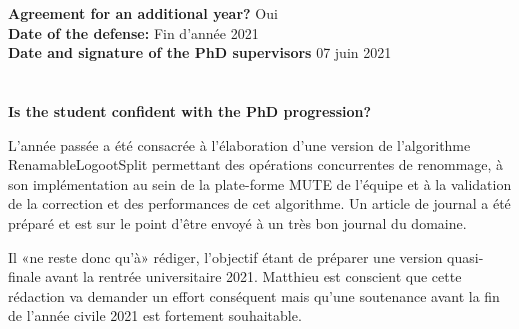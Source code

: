 \documentclass[12pt]{article}
\newcommand{\commentaire}[1]{\small\textit{#1}}
\begin{document}
\noindent\textbf{Agreement for an additional year?}
Oui
\\

\noindent\textbf{Date of the defense:}
Fin d'année 2021
\\


\noindent\textbf{Date and signature of the PhD supervisors}
07 juin 2021

\newpage
\section*{} %


\noindent\textbf{Is the student confident with the PhD progression?}

L'année passée a été consacrée à l'élaboration d'une version de l'algorithme RenamableLogootSplit permettant des opérations concurrentes de renommage, à son implémentation au sein de la plate-forme MUTE de l'équipe et à la validation de la correction et des performances de cet algorithme. Un article de journal a été préparé et est sur le point d'être envoyé à un très bon journal du domaine.

Il «ne reste donc qu'à» rédiger, l'objectif étant de préparer une version quasi-finale avant la rentrée universitaire 2021. Matthieu est conscient que cette rédaction va demander un effort conséquent mais qu'une soutenance avant la fin de l'année civile 2021 est fortement souhaitable.
\\

\end{document}
